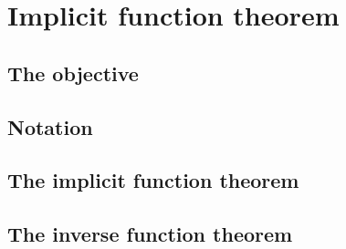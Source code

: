 \section{Implicit function theorem}

\subsection{The objective}

\subsection{Notation}

\subsection{The implicit function theorem}

\subsection{The inverse function theorem}
